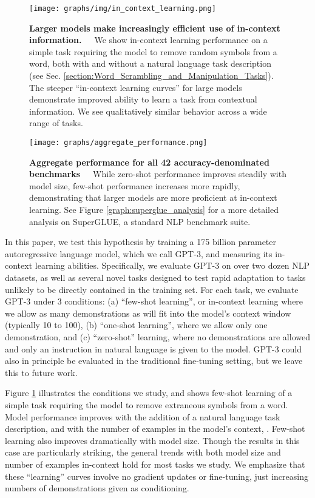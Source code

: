 \documentclass{article}
\begin{document}
\begin{figure}
\centering\texttt{[image: graphs/img/in\_context\_learning.png]}
\caption{\textbf{Larger models make increasingly efficient use of in-context information.}~~~We show in-context learning performance on a simple task requiring the model to remove random symbols from a word, both with and without a natural language task description (see Sec. \ref{section:Word_Scrambling_and_Manipulation_Tasks}). The steeper ``in-context learning curves'' for large models demonstrate improved ability to learn a task from contextual information. We see qualitatively similar behavior across a wide range of tasks.}
\label{graph:scramble_prompted}
\end{figure} 
\begin{figure}
\begin{center}
\texttt{[image: graphs/aggregate\_performance.png]}
\end{center}
\caption{\textbf{Aggregate performance for all 42 accuracy-denominated benchmarks}~~~While zero-shot performance improves steadily with model size, few-shot performance increases more rapidly, demonstrating that larger models are more proficient at in-context learning. See Figure \ref{graph:superglue_analysis} for a more detailed analysis on SuperGLUE, a standard NLP benchmark suite.}
\label{figure:aggregate_performance}
\end{figure}

In this paper, we test this hypothesis by training a 175 billion parameter autoregressive language model, which we call GPT-3, and measuring its in-context learning abilities.  Specifically, we evaluate GPT-3 on over two dozen NLP datasets, as well as several novel tasks designed to test rapid adaptation to tasks unlikely to be directly contained in the training set.  For each task, we evaluate GPT-3 under 3 conditions: (a) ``few-shot learning'', or in-context learning where we allow as many demonstrations as will fit into the model’s context window (typically 10 to 100), (b) ``one-shot learning'', where we allow only one demonstration, and (c) ``zero-shot'' learning, where no demonstrations are allowed and only an instruction in natural language is given to the model.  GPT-3 could also in principle be evaluated in the traditional fine-tuning setting, but we leave this to future work.

 Figure \ref{graph:scramble_prompted} illustrates the conditions we study, and shows few-shot learning of a simple task requiring the model to remove extraneous symbols from a word. Model performance improves with the addition of a natural language task description, and with the number of examples in the model's context, . Few-shot learning also improves dramatically with model size.  Though the results in this case are particularly striking, the general trends with both model size and number of examples in-context hold for most tasks we study.  We emphasize that these ``learning'' curves involve no gradient updates or fine-tuning, just increasing numbers of demonstrations given as conditioning.
\end{document}
